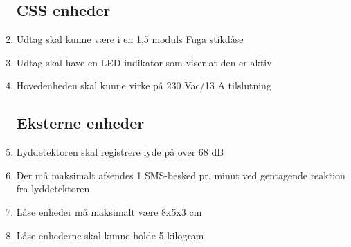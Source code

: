 \begin{enumerate}
	\subsection*{CSS enheder}
	\item Udtag skal kunne være i en 1,5 moduls Fuga stikdåse
	\item Udtag skal have en LED indikator som viser at den er aktiv
	\item Hovedenheden skal kunne virke på 230 Vac/13 A tilslutning

	\subsection*{Eksterne enheder}
	\item Lyddetektoren skal registrere lyde på over 68 dB
	\item Der må maksimalt afsendes 1 SMS-besked pr. minut ved gentagende reaktion fra lyddetektoren
	\item Låse enheder må maksimalt være 8x5x3 cm
	\item Låse enhederne skal kunne holde 5 kilogram

\end{enumerate}

